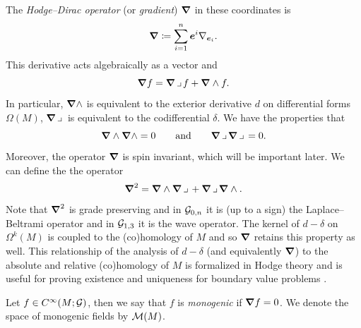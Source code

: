 \documentclass{article}
\begin{document}
The \emph{Hodge--Dirac operator} (or \emph{gradient}) $\boldsymbol{\nabla}$ in these coordinates is
\begin{equation}
    \boldsymbol{\nabla} \coloneqq \sum_{i=1}^n \boldsymbol{e}^i \nabla_{\boldsymbol{e}_i}.
\end{equation}
This derivative acts algebraically as a vector and
\begin{equation}
\boldsymbol{\nabla} f = \boldsymbol{\nabla} \hspace*{.5mm}\lrcorner \hspace*{.5mm} f + \boldsymbol{\nabla} \wedge f.
\end{equation}
In particular, $\boldsymbol{\nabla} \wedge$ is equivalent to the exterior derivative $d$ on differential forms $\Omega(M)$, $\boldsymbol{\nabla} \hspace*{.5mm}\lrcorner \hspace*{.5mm}$ is equivalent to the codifferential $\delta$. We have the properties that
\begin{equation}
    \boldsymbol{\nabla} \wedge \boldsymbol{\nabla} \wedge = 0 \qquad \textrm{and} \qquad \boldsymbol{\nabla} \hspace*{.5mm}\lrcorner \hspace*{.5mm} \boldsymbol{\nabla} \hspace*{.5mm}\lrcorner \hspace*{.5mm} = 0.
\end{equation}
Moreover, the operator $\boldsymbol{\nabla}$ is spin invariant, which will be important later. We can define the the operator 
\begin{equation}
    \boldsymbol{\nabla}^2 = \boldsymbol{\nabla} \wedge \boldsymbol{\nabla} \hspace*{.5mm}\lrcorner \hspace*{.5mm} + \boldsymbol{\nabla} \hspace*{.5mm}\lrcorner \hspace*{.5mm} \boldsymbol{\nabla} \wedge.
\end{equation}
Note that $\boldsymbol{\nabla}^2$ is grade preserving and in $\mathcal{G}_{0,n}$ it is (up to a sign) the Laplace--Beltrami operator and in $\mathcal{G}_{1,3}$ it is the wave operator. The kernel of $d-\delta$ on $\Omega^k(M)$ is coupled to the (co)homology of $M$ and so $\boldsymbol{\nabla}$ retains this property as well. This relationship of the analysis of $d-\delta$ (and equivalently $\boldsymbol{\nabla}$) to the absolute and relative (co)homology of $M$ is formalized in Hodge theory and is useful for proving existence and uniqueness for boundary value problems \cite{schwarz_hodge_1995}. 

\begin{definition}
Let $f\in C^\infty(M;\mathcal{G})$, then we say that $f$ is \emph{monogenic} if $\boldsymbol{\nabla} f = 0$. We denote the space of monogenic fields by $\mathcal{M}(M)$.
\end{definition}
\end{document}
